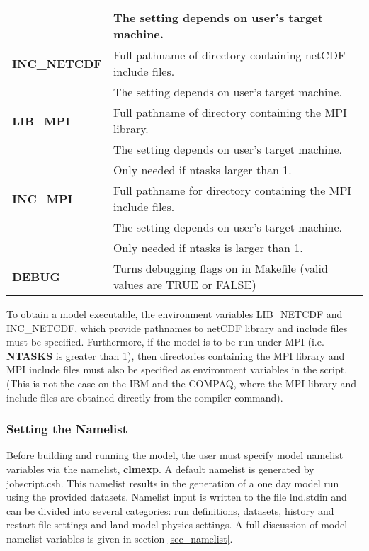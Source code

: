\begin{longtable}{|p{1.5in}|p{4.5in}|}
                     &   The setting depends on user's target machine. \\ \hline
{\bf INC\_NETCDF}    &   Full pathname of directory containing netCDF include files. \\ 
                     &   The setting depends on user's target machine. \\ \hline
{\bf LIB\_MPI}       &   Full pathname of directory containing the MPI library. \\ 
                     &   The setting depends on user's target machine. \\ 
                     &   Only needed if ntasks larger than 1.  \\ \hline
{\bf INC\_MPI}       &   Full pathname for directory containing the MPI include files. \\
                     &   The setting depends on user's target machine. \\ 
                     &   Only needed if ntasks is larger than 1.  \\ \hline
{\bf DEBUG}          &   Turns debugging flags on in Makefile (valid values are TRUE or FALSE) \\ \hline
\end{longtable}
\bigskip

To obtain a model executable, the environment variables LIB\_NETCDF
and INC\_NETCDF, which provide pathnames to netCDF library and include
files must be specified. Furthermore, if the model is to be run under
MPI (i.e. {\bf NTASKS} is greater than 1), then directories containing
the MPI library and MPI include files must also be specified as
environment variables in the script. (This is not the case on the 
IBM and the COMPAQ, where the MPI library and include files are
obtained directly from the compiler command).


\subsubsection {Setting the Namelist}
\label{subsubsec_namelist}

Before building and running the model, the user must specify model
namelist variables via the namelist, {\bf clmexp}.  A default namelist
is generated by jobscript.csh. This namelist results in the generation
of a one day model run using the provided datasets.  Namelist input is
written to the file lnd.stdin and can be divided into several
categories: run definitions, datasets, history and restart file
settings and land model physics settings. A full discussion of model
namelist variables is given in section \ref{sec_namelist}.


